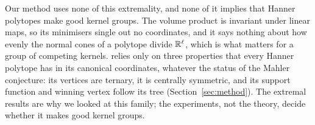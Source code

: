 Our method uses none of this extremality, and none of it implies that Hanner polytopes make
good kernel groups. The volume product is invariant under linear maps, so its minimisers
single out no coordinates, and it says nothing about how evenly the normal cones of a
polytope divide $\mathbb{R}^\ell$, which is what matters for a group of competing kernels. \hh{}
relies only on three properties that every Hanner polytope has in its canonical coordinates,
whatever the status of the Mahler conjecture: its vertices are ternary, it is centrally
symmetric, and its support function and winning vertex follow its tree
(Section~\ref{sec:method}). The extremal results are why we looked at this family; the
experiments, not the theory, decide whether it makes good kernel groups.
